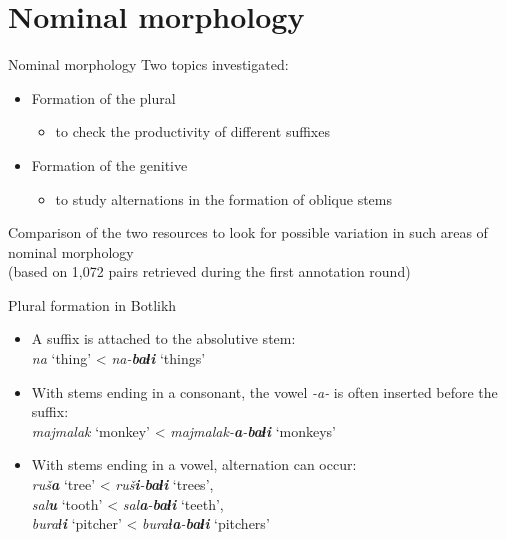 \section{Nominal morphology}
\begin{frame}{Nominal morphology}
Two topics investigated:
\begin{itemize}
    \item Formation of the plural
    \begin{itemize}
        \item to check the productivity of different suffixes
    \end{itemize}
    \item Formation of the genitive
    \begin{itemize}
        \item to study alternations in the formation of oblique stems
    \end{itemize}
\end{itemize}
Comparison of the two resources to look for possible variation in such areas of nominal morphology \\ (based on 1,072 pairs retrieved during the first annotation round)
\end{frame}

\begin{frame}{Plural formation in Botlikh}
\begin{itemize}
    \item A suffix is attached to the absolutive stem: \\ \textit{na} `thing' < \textit{na-\textbf{baɬi}} `things'
    \item With stems ending in a consonant, the vowel \textit{-a-} is often inserted before the suffix: \\ \textit{majmalak}  `monkey' < \textit{majmalak-\textbf{a}-\textbf{baɬi}} `monkeys'
    \item With stems ending in a vowel, alternation can occur: \\ \textit{ruš\textbf{a}}  `tree' < \textit{ruš\textbf{i}-\textbf{baɬi}} `trees', \\ \textit{sal\textbf{u}}  `tooth' < \textit{sal\textbf{a}-\textbf{baɬi}} `teeth', \\ \textit{buraɬ\textbf{i}}  `pitcher' < \textit{buraɬ\textbf{a}-\textbf{baɬi}} `pitchers'
\end{itemize}
\end{frame}

